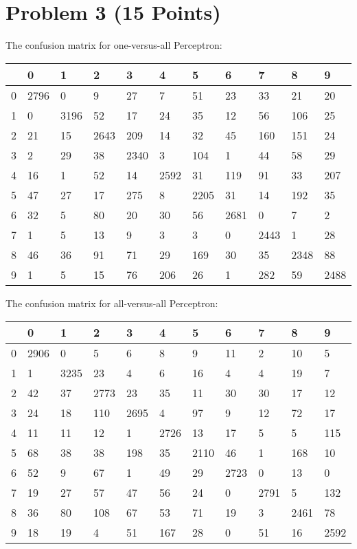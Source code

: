 \documentclass[10pt]{article}
\begin{document}
\section*{Problem 3 (15 Points)}
The confusion matrix for one-versus-all Perceptron:
\begin{center}
\begin{tabular}{l|l|l|l|l|l|l|l|l|l|l|}
   & 0 & 1 & 2 & 3 & 4 & 5 & 6 & 7 & 8 & 9 \\
   \hline
0  & 2796 &  0  &  9  &  27  &  7  &  51  &  23  &  33  &  21  &  20 \\
1  & 0    &  3196  &  52  &  17  &  24  &  35  &  12  &  56  &  106  &  25 \\ 
2  & 21   &  15  &  2643  &  209  &  14  &  32  &  45  &  160  &  151  &  24 \\
3  & 2    &  29  &  38  &  2340  &  3  &  104  &  1  &  44  &  58  &  29 \\
4  & 16   &  1  &  52  &  14  &  2592  &  31  &  119  &  91  &  33  &  207 \\
5  & 47   &  27  &  17  &  275  &  8  &  2205  &  31  &  14  &  192  &  35 \\
6  & 32   &  5  &  80  &  20  &  30  &  56  &  2681  &  0  &  7  &  2 \\
7  & 1    &  5  &  13  &  9  &  3  &  3  &  0  &  2443  &  1  &  28 \\
8  & 46   &  36  &  91  &  71  &  29  &  169  &  30  &  35  &  2348  &  88 \\ 
9  & 1    &  5  &  15  &  76  &  206  &  26  &  1  &  282  &  59  &  2488 \\
\end{tabular}
\end{center}
The confusion matrix for all-versus-all Perceptron:
\begin{center}
\begin{tabular}{l|l|l|l|l|l|l|l|l|l|l|}
 & 0 & 1 & 2 & 3 & 4 & 5 & 6 & 7 & 8 & 9 \\
\hline
0  &  2906  &  0  &  5  &  6  &  8  &  9  &  11  &  2  &  10  &  5  \\
1  &  1  &  3235  &  23  &  4  &  6  &  16  &  4  &  4  &  19  &  7 \\
2  &  42  &  37  &  2773  &  23  &  35  &  11  &  30  &  30  &  17  &  12 \\
3  &  24  &  18  &  110  &  2695  &  4  &  97  &  9  &  12  &  72  &  17 \\
4  &  11  &  11  &  12  &  1  &  2726  &  13  &  17  &  5  &  5  &  115 \\
5  &  68  &  38  &  38  &  198  &  35  &  2110  &  46  &  1  &  168  &  10 \\ 
6  &  52  &  9  &  67  &  1  &  49  &  29  &  2723  &  0  &  13  &  0 \\
7  &  19  &  27  &  57  &  47  &  56  &  24  &  0  &  2791  &  5  &  132 \\ 
8  &  36  &  80  &  108  &  67  &  53  &  71  &  19  &  3  &  2461  &  78 \\
9  &  18  &  19  &  4  &  51  &  167  &  28  &  0  &  51  &  16  &  2592 \\
\end{tabular}
\end{center}
\end{document}
